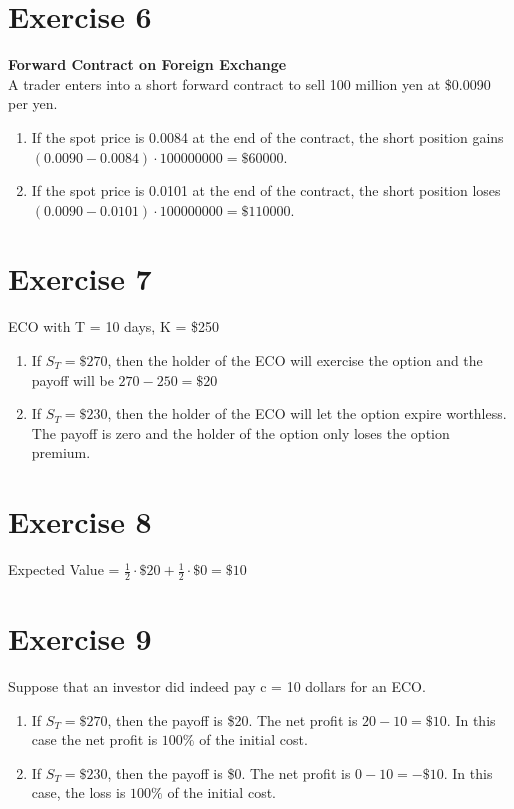 \documentclass{article}
\begin{document}
\section*{Exercise 6}
\begin{flushleft}
    \textbf{Forward Contract on Foreign Exchange} \\
    A trader enters into a short forward contract to sell 100 million yen at \$0.0090 per yen.
    \begin{enumerate}
        \item If the spot price is 0.0084 at the end of the contract, the short position gains $(0.0090 - 0.0084) \cdot 100000000 = \$ 60000$.
        \item If the spot price is 0.0101 at the end of the contract, the short position loses $(0.0090 - 0.0101) \cdot 100000000 = \$ 110000$.
    \end{enumerate}
\end{flushleft}

\section*{Exercise 7}
\begin{flushleft}
    ECO with T = 10 days, K = \$250
    \begin{enumerate}
        \item If $S_T = \$270$, then the holder of the ECO will exercise the option and the payoff will be $270 - 250 = \$20$
        \item If $S_T = \$230$, then the holder of the ECO will let the option expire worthless. The payoff is zero and the holder of the option only loses the option premium.        
    \end{enumerate}
\end{flushleft}

\section*{Exercise 8}
\begin{flushleft}
    Expected Value = $\frac{1}{2} \cdot \$20 + \frac{1}{2} \cdot \$0 = \$10$
\end{flushleft}

\section*{Exercise 9}
\begin{flushleft}
    Suppose that an investor did indeed pay c = 10 dollars for an ECO.
    \begin{enumerate}
        \item If $S_T = \$270$, then the payoff is \$20. The net profit is $20 - 10 = \$10$. In this case the net profit is $100\%$ of the initial cost.
        \item If $S_T = \$230$, then the payoff is \$0. The net profit is $0 - 10 = -\$10$. In this case, the loss is  $100\%$ of the initial cost.
    \end{enumerate}
\end{flushleft}
\end{document}
